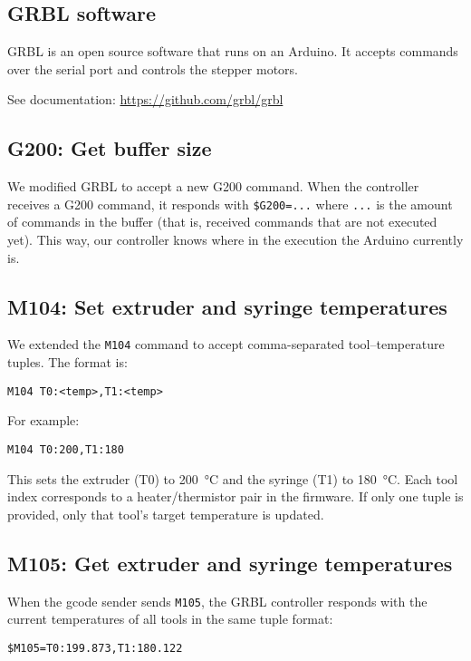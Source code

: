 \subsection{GRBL software}

GRBL is an open source software that runs on an Arduino.
It accepts commands over the serial port and controls the stepper motors.

See documentation: \url{https://github.com/grbl/grbl}

\subsection{G200: Get buffer size}

We modified GRBL to accept a new G200 command.
When the controller receives a G200 command, it responds
with \verb|$G200=...| where \verb|...| is the amount of commands in the
buffer (that is, received commands that are not executed yet).
This way, our controller knows where in the execution the Arduino
currently is.

\subsection{M104: Set extruder and syringe temperatures}

We extended the \verb|M104| command to accept comma-separated tool--temperature tuples.  
The format is:

\begin{verbatim}
M104 T0:<temp>,T1:<temp>
\end{verbatim}

For example:
\begin{verbatim}
M104 T0:200,T1:180
\end{verbatim}

This sets the extruder (T0) to 200~°C and the syringe (T1) to 180~°C.  
Each tool index corresponds to a heater/thermistor pair in the firmware.  
If only one tuple is provided, only that tool's target temperature is updated.

\subsection{M105: Get extruder and syringe temperatures}

When the gcode sender sends \verb|M105|, the GRBL controller responds
with the current temperatures of all tools in the same tuple format:

\begin{verbatim}
$M105=T0:199.873,T1:180.122
\end{verbatim}

